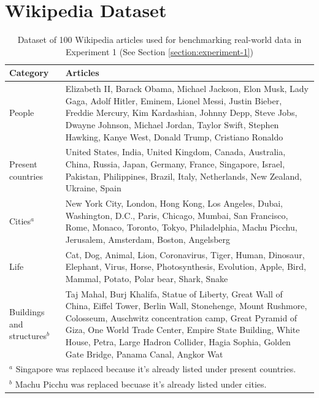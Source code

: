 \documentclass[12pt,oneside]{memoir}
\begin{document}
\printbibliography[title={References}]

\clearpage
\appendix
\renewcommand{\chaptername}{Appendix}

\chapter{Wikipedia Dataset}

\begin{table}[ht]
    \centering
    \caption{Dataset of 100 Wikipedia articles used for benchmarking real-world data in Experiment 1 (See Section \ref{section:experiment-1})}
    \label{table:real-world-wikipedia-dataset}
    \begin{tabular}{p{1in}p{4.8in}}
        \toprule
        \textbf{Category} & \textbf{Articles} \\
        \midrule
        People & Elizabeth II, Barack Obama, Michael Jackson, Elon Musk, Lady Gaga, Adolf Hitler, Eminem, Lionel Messi, Justin Bieber, Freddie Mercury, Kim Kardashian, Johnny Depp, Steve Jobs, Dwayne Johnson, Michael Jordan, Taylor Swift, Stephen Hawking, Kanye West, Donald Trump, Cristiano Ronaldo\\
        \midrule
        Present countries & United States, India, United Kingdom, Canada, Australia, China, Russia, Japan, Germany, France, Singapore, Israel, Pakistan, Philippines, Brazil, Italy, Netherlands, New Zealand, Ukraine, Spain\\
        \midrule
        Cities$^a$ & New York City, London, Hong Kong, Los Angeles, Dubai, Washington, D.C., Paris, Chicago, Mumbai, San Francisco, Rome, Monaco, Toronto, Tokyo, Philadelphia, Machu Picchu, Jerusalem, Amsterdam, Boston, Angelsberg\\
        \midrule
        Life & Cat, Dog, Animal, Lion, Coronavirus, Tiger, Human, Dinosaur, Elephant, Virus, Horse, Photosynthesis, Evolution, Apple, Bird, Mammal, Potato, Polar bear, Shark, Snake\\
        \midrule
        Buildings and structures$^b$ & Taj Mahal, Burj Khalifa, Statue of Liberty, Great Wall of China, Eiffel Tower, Berlin Wall, Stonehenge, Mount Rushmore, Colosseum, Auschwitz concentration camp, Great Pyramid of Giza, One World Trade Center, Empire State Building, White House, Petra, Large Hadron Collider, Hagia Sophia, Golden Gate Bridge, Panama Canal, Angkor Wat\\
        \bottomrule
        \multicolumn{2}{l}{\footnotesize $^a$ Singapore was replaced because it's already listed under present countries.}\\
        \multicolumn{2}{l}{\footnotesize $^b$ Machu Picchu was replaced becuase it's already listed under cities.}
    \end{tabular}
\end{table}
\end{document}

